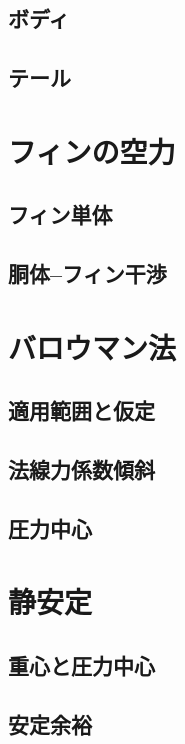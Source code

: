 \documentclass[uplatex,dvipdfmx,a4j,11pt]{jsreport}
\numberwithin{equation}{chapter}
\begin{document}
\subsection{ボディ}

\subsection{テール}

\section{フィンの空力}

\subsection{フィン単体}

\subsection{胴体--フィン干渉}

\section{バロウマン法}

\subsection{適用範囲と仮定}

\subsection{法線力係数傾斜}

\subsection{圧力中心}

\section{静安定}

\subsection{重心と圧力中心}

\subsection{安定余裕}
\end{document}
